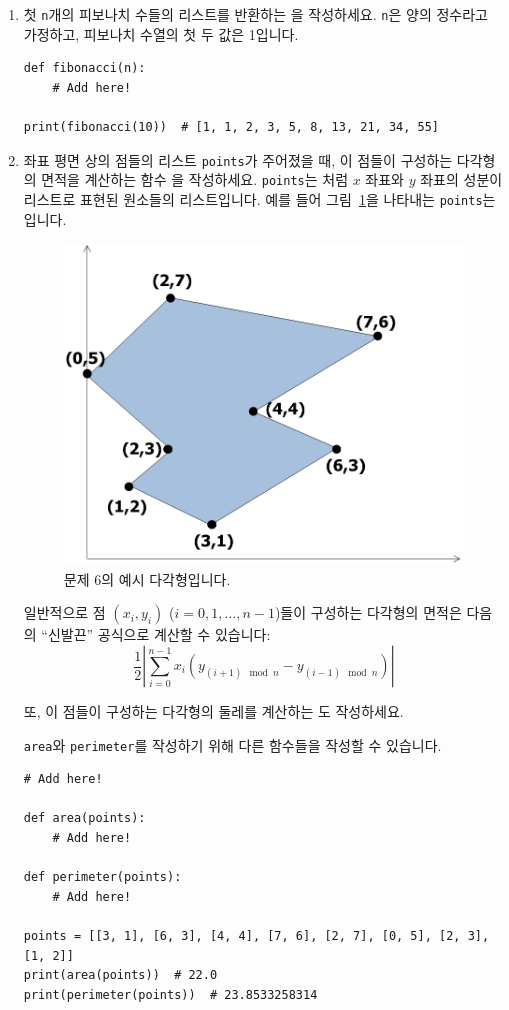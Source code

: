 \documentclass[../main.tex]{subfiles}
\begin{document}
\begin{enumerate}
\item 첫 \verb/n/개의 피보나치 수들의 리스트를 반환하는 을 작성하세요.
  \verb/n/은 양의 정수라고 가정하고, 피보나치 수열의 첫 두 값은 1입니다.
\begin{verbatim}
def fibonacci(n):
    # Add here!

print(fibonacci(10))  # [1, 1, 2, 3, 5, 8, 13, 21, 34, 55]
\end{verbatim}

\item 좌표 평면 상의 점들의 리스트 \verb/points/가 주어졌을 때, 이 점들이 구성하는 다각형의 면적을 계산하는 함수 을 작성하세요.
\texttt{points}는 \pyin{[3, 4]}처럼 $x$ 좌표와 $y$ 좌표의 성분이 리스트로 표현된 원소들의 리스트입니다.
예를 들어 그림~\ref{fig:lecture4q6}을 나타내는 \texttt{points}는 \pyin{[[3, 1], [6, 3], [4, 4], [7, 6], [2, 7], [0, 5], [2, 3], [1, 2]]}입니다.
\begin{figure}[H]
\centering
\includegraphics[width=0.5\linewidth]{"./lectures/lecture4_q6"}
\caption{문제 6의 예시 다각형입니다.}\label{fig:lecture4q6}
\end{figure}

일반적으로 점 $(x_i, y_i)$ ($i = 0, 1, \dots, n - 1$)들이 구성하는 다각형의 면적은 다음의 ``신발끈'' 공식으로 계산할 수 있습니다:
\[
\frac 12 \left| \sum_{i = 0}^{n - 1} x_i \left(y_{(i + 1) \mod n} - y_{(i - 1) \mod n}\right)\right|
\]

또, 이 점들이 구성하는 다각형의 둘레를 계산하는 도 작성하세요.

\verb/area/와 \verb/perimeter/를 작성하기 위해 다른 함수들을 작성할 수 있습니다.

\begin{verbatim}
# Add here!

def area(points):
    # Add here!

def perimeter(points):
    # Add here!

points = [[3, 1], [6, 3], [4, 4], [7, 6], [2, 7], [0, 5], [2, 3], [1, 2]]
print(area(points))  # 22.0
print(perimeter(points))  # 23.8533258314
\end{verbatim}


\end{enumerate}
\end{document}
